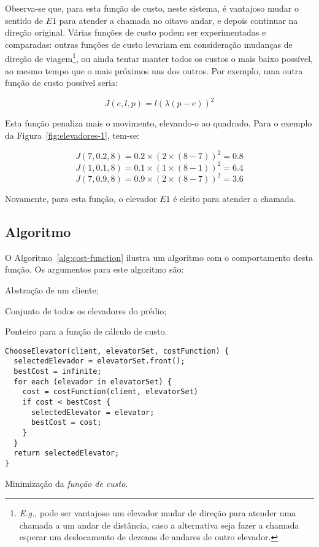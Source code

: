 Observa-se que, para esta função de custo, neste sistema, é vantajoso mudar o
sentido de $E1$ para atender a chamada no oitavo andar, e depois continuar na
direção original. Várias funções de custo podem ser experimentadas e comparadas:
outras funções de custo levariam em consideração mudanças de direção de
viagem\footnote{\textit{E.g.}, pode ser vantajoso um elevador mudar de direção
para atender uma chamada a um andar de distância, caso a alternativa seja fazer a
chamada esperar um deslocamento de dezenas de andares de outro elevador.}, ou
ainda tentar manter todos os custos o mais baixo possível, ao mesmo tempo que o
mais próximos uns dos outros. Por exemplo, uma outra função de custo possível
seria:

\[J(e, l, p) = l(\lambda(p - e))^{2}\]

Esta função penaliza mais o movimento, elevando-o ao quadrado. Para o exemplo da
Figura~\ref{fig:elevadores-1}, tem-se:

\[J(7, 0.2, 8) = 0.2 \times (2 \times (8-7))^2 = 0.8\]
\[J(1, 0.1, 8) = 0.1 \times (1 \times (8-1))^2 = 6.4\]
\[J(7, 0.9, 8) = 0.9 \times (2 \times (8-7))^2 = 3.6\]

Novamente, para esta função, o elevador $E1$ é eleito para atender a chamada.

\subsection{Algoritmo}

O Algoritmo~\ref{alg:cost-function} ilustra um algoritmo com o comportamento desta
função. Os argumentos para este algoritmo são:

\begin{description}[leftmargin=!,labelwidth=\widthof{\bfseries $costFunction$}]
  \item[$client$] Abstração de um cliente;
  \item[$elevatorset$] Conjunto de todos os elevadores do prédio;
  \item[$costFunction$] Ponteiro para a função de cálculo de custo.
\end{description}

\begin{algorithm}[htb]
  \centering
    \begin{verbatim}
ChooseElevator(client, elevatorSet, costFunction) {
  selectedElevador = elevatorSet.front();
  bestCost = infinite;
  for each (elevador in elevatorSet) {
    cost = costFunction(client, elevatorSet)
    if cost < bestCost {
      selectedElevator = elevator;
      bestCost = cost;
    }
  }
  return selectedElevator;
}
    \end{verbatim}
  \caption{\label{alg:cost-function}Minimização da \textit{função de custo}.}
\end{algorithm}

